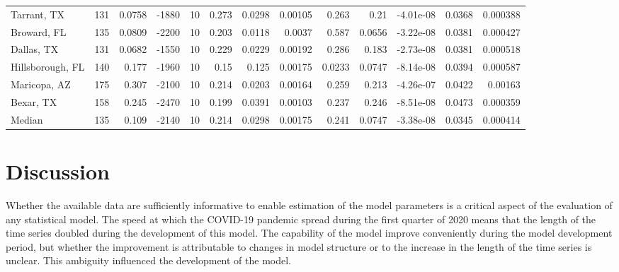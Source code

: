 \documentclass[12pt,letterpaper]{article}
\begin{document}
\begin{sidewaystable}
{\begin{tabular}{lrrrrrrrrrrrr}
 Tarrant, TX       &   131 &  0.0758 & -1880 &    10 &           0.273 &           0.0298 &       0.00105  &       0.263  &     0.21     &        -4.01e-08 &            0.0368 &        0.000388 \\
 Broward, FL       &   135 &  0.0809 & -2200 &    10 &           0.203 &           0.0118 &       0.0037   &       0.587  &     0.0656   &        -3.22e-08 &            0.0381 &        0.000427 \\
 Dallas, TX        &   131 &  0.0682 & -1550 &    10 &           0.229 &           0.0229 &       0.00192  &       0.286  &     0.183    &        -2.73e-08 &            0.0381 &        0.000518 \\
 Hillsborough, FL  &   140 &  0.177  & -1960 &    10 &           0.15  &           0.125  &       0.00175  &       0.0233 &     0.0747   &        -8.14e-08 &            0.0394 &        0.000587 \\
 Maricopa, AZ      &   175 &  0.307  & -2100 &    10 &           0.214 &           0.0203 &       0.00164  &       0.259  &     0.213    &        -4.26e-07 &            0.0422 &        0.00163  \\
 Bexar, TX         &   158 &  0.245  & -2470 &    10 &           0.199 &           0.0391 &       0.00103  &       0.237  &     0.246    &        -8.51e-08 &            0.0473 &        0.000359 \\
\hline
 Median            &   135 &  0.109  & -2140 &    10 &           0.214 &           0.0298 &       0.00175  &       0.241  &     0.0747   &        -3.38e-08 &            0.0345 &        0.000414 \\
\hline
\end{tabular}

}\end{sidewaystable}

\clearpage
\section*{Discussion}

Whether the available data are sufficiently informative to enable
estimation of the model parameters is a critical aspect of the
evaluation of any statistical model.
The speed at which the COVID-19 pandemic spread during the first
quarter of
2020 means that the length of the time series doubled during
the development of this model. The capability of the
model improve conveniently during the model development period,
but whether the improvement is
attributable to changes in model structure or to the increase in the
length of the time series is unclear. This ambiguity influenced the
development of the model.

\cite{Sibert2017,Nielsen2014b,Chen2020}

\clearpage
\printbibliography[title=References]
\end{document}
